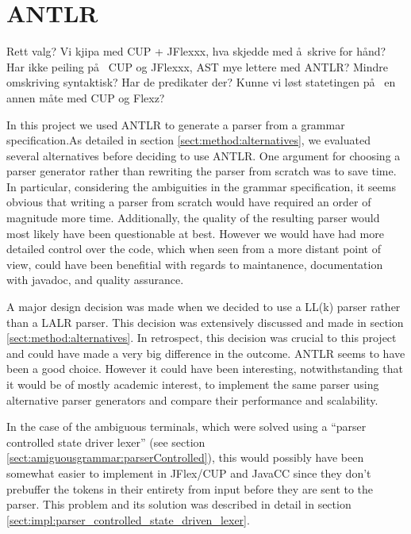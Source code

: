 \section{ANTLR}
Rett valg?
Vi kjipa med CUP + JFlexxx, hva skjedde med \aa~skrive for h\aa nd?
Har ikke peiling p\aa~ CUP og JFlexxx, AST mye lettere med ANTLR? Mindre
omskriving syntaktisk? Har de predikater der? Kunne vi l\o st statetingen p\aa~
en annen m\aa te med CUP og Flexz?   

In this project we used ANTLR to generate a parser from a grammar
specification.As detailed in section \ref{sect:method:alternatives}, we
evaluated several alternatives before deciding to use ANTLR. One argument for
choosing a parser generator rather than rewriting the parser from scratch was to
save time. In particular, considering the ambiguities in the grammar
specification, it seems obvious that writing a parser from scratch would
have required an order of magnitude more time. Additionally, the quality of the
resulting parser would most likely have been questionable at best. However
we would have had more detailed control over the code, which when seen from a
more distant point of view, could have been benefitial with regards to
maintanence, documentation with javadoc, and quality assurance.

A major design decision was made when we decided to use a LL(k) parser rather
than a LALR parser. This decision was extensively discussed and made in
section \ref{sect:method:alternatives}. In retrospect, this decision was
crucial to this project and could have made a very big difference in the
outcome. ANTLR seems to have been a good choice. However it could have been
interesting, notwithstanding that it would be of mostly academic interest, to  
implement the same parser using alternative parser generators and compare their
performance and scalability.

In the case of the ambiguous terminals, which were solved using a ``parser
controlled state driver lexer'' (see section 
\ref{sect:amiguousgrammar:parserControlled}), this would possibly have been
somewhat easier to implement in JFlex/CUP and JavaCC since they don't prebuffer 
the tokens in their entirety from input before they are sent to the parser. This
problem and its solution was described in detail in section
\ref{sect:impl:parser_controlled_state_driven_lexer}.